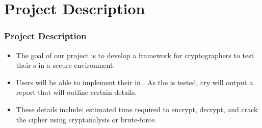 \section{Project Description}


\begin{frame}
\frametitle{Project Description}
\begin{itemize}
\item The goal of our project is to develop a framework for
  cryptographers to test their \cs s in a
  secure environment.
\item Users will be able to implement their
  \cs{} in \cry. As the \cs{} is tested, cry will
  output a report that will outline certain details.
\item These details include: estimated time required to
  encrypt, decrypt, and crack the cipher using cryptanalysis
  or brute-force.
\end{itemize}
\end{frame}
